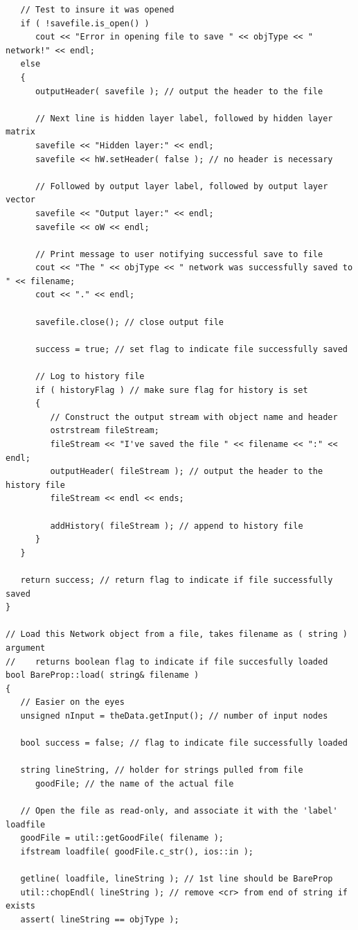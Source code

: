 \documentclass{report}[10pt]
\begin{document}
\begin{verbatim}
   // Test to insure it was opened
   if ( !savefile.is_open() )
      cout << "Error in opening file to save " << objType << " network!" << endl;
   else
   {
      outputHeader( savefile ); // output the header to the file
      
      // Next line is hidden layer label, followed by hidden layer matrix
      savefile << "Hidden layer:" << endl;
      savefile << hW.setHeader( false ); // no header is necessary

      // Followed by output layer label, followed by output layer vector
      savefile << "Output layer:" << endl;
      savefile << oW << endl;

      // Print message to user notifying successful save to file
      cout << "The " << objType << " network was successfully saved to " << filename;
      cout << "." << endl;

      savefile.close(); // close output file

      success = true; // set flag to indicate file successfully saved

      // Log to history file
      if ( historyFlag ) // make sure flag for history is set
      {
         // Construct the output stream with object name and header
         ostrstream fileStream;
         fileStream << "I've saved the file " << filename << ":" << endl;
         outputHeader( fileStream ); // output the header to the history file
         fileStream << endl << ends;
         
         addHistory( fileStream ); // append to history file
      }
   }

   return success; // return flag to indicate if file successfully saved
}

// Load this Network object from a file, takes filename as ( string ) argument
//    returns boolean flag to indicate if file succesfully loaded
bool BareProp::load( string& filename )
{
   // Easier on the eyes
   unsigned nInput = theData.getInput(); // number of input nodes
   
   bool success = false; // flag to indicate file successfully loaded
   
   string lineString, // holder for strings pulled from file
      goodFile; // the name of the actual file

   // Open the file as read-only, and associate it with the 'label' loadfile
   goodFile = util::getGoodFile( filename );
   ifstream loadfile( goodFile.c_str(), ios::in );

   getline( loadfile, lineString ); // 1st line should be BareProp
   util::chopEndl( lineString ); // remove <cr> from end of string if exists
   assert( lineString == objType );


\end{verbatim}
\end{document}
